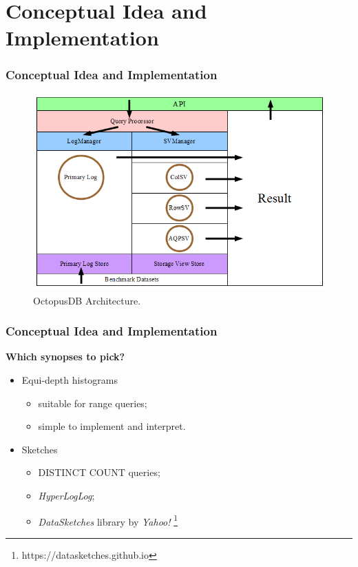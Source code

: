\documentclass{beamer}
\begin{document}
\section{Conceptual Idea and Implementation}
\begin{frame}
\frametitle{Conceptual Idea and Implementation}
\begin{figure}
\centering
\includegraphics[scale=0.5]{img/blinktopus_architecture.png}
\caption{OctopusDB Architecture.}
\end{figure}
\end{frame}

\begin{frame}
\frametitle{Conceptual Idea and Implementation}
\textbf{Which synopses to pick?} \pause
\begin{itemize}
\item{Equi-depth histograms}
\begin{itemize}
\item{suitable for range queries;}
\item{simple to implement and interpret.}
\end{itemize}
\pause
\item{Sketches}
\begin{itemize}
\item{DISTINCT COUNT queries;}
\item{\emph{HyperLogLog};}
\item{\textit{DataSketches} library by \textit{Yahoo!} \footnote{https://datasketches.github.io}}
\end{itemize}
\end{itemize}
\end{frame}
\end{document}
